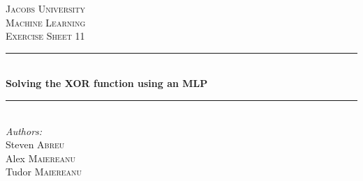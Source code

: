 \documentclass[12pt]{article}
\begin{document}
\def\layersep{2.5cm}

\begin{titlepage}

\newcommand{\HRule}{\rule{\linewidth}{0.4mm}} 

\center 
 

\textsc{\LARGE Jacobs University}\\[1.5cm] %
\textsc{\Large Machine Learning}\\[0.5cm] %
\textsc{\large Exercise Sheet 11}\\[0.5cm] %


\HRule \\[0.4cm]
{ \huge \bfseries Solving the XOR function using an MLP}\\[0.4cm] %
\HRule \\[1.5cm]
 


\Large \emph{Authors:}\\
Steven \textsc{Abreu}\\
Alex \textsc{Maiereanu}\\
Tudor \textsc{Maiereanu}\\[3cm] %


\end{titlepage}
\end{document}

